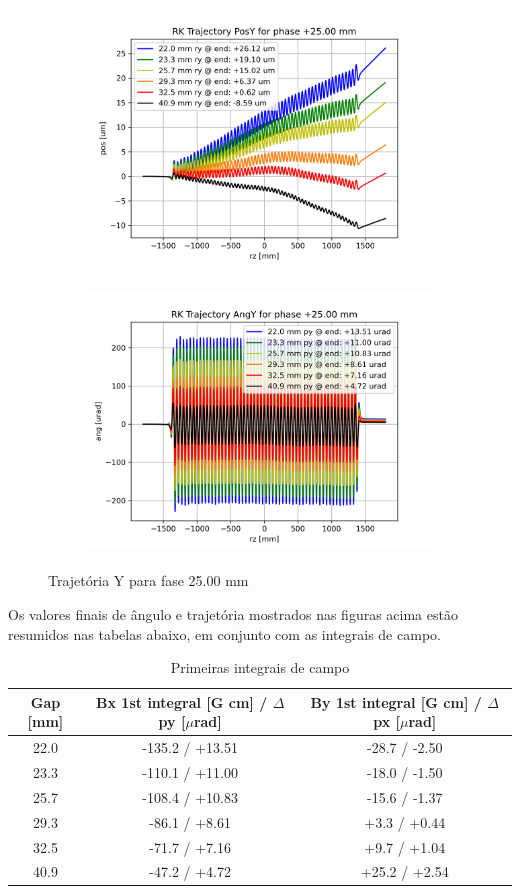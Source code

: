\documentclass[a4paper,12pt]{article}
\begin{document}
\begin{figure}[H]
\begin{subfigure}{0.5\textwidth}
\includegraphics[width=0.9\linewidth, height=7cm]{figs/phase25 RK Posy.png} 
\label{fig:subim125ty}
\end{subfigure}
\begin{subfigure}{0.5\textwidth}
\includegraphics[width=0.9\linewidth, height=7cm]{figs/phase25 RK Angy.png}
\label{fig:subim225ty}
\end{subfigure}
\caption{Trajetória Y para fase 25.00 mm}
\label{fig:trajy_25}
\end{figure}

Os valores finais de ângulo e trajetória mostrados nas figuras acima estão resumidos nas tabelas abaixo, em conjunto com as integrais de campo.


\begin{table}[H]
\centering
\caption{Primeiras integrais de campo}
\begin{tabular}{|c|c|c|}
\hline
   Gap [mm] & Bx 1st integral [G cm] / $\Delta$ py [$\mu$rad] & By 1st integral [G cm] / $\Delta$ px [$\mu$rad] \\
\hline
    22.0 & -135.2 / +13.51 & -28.7 / -2.50 \\
    23.3 & -110.1 / +11.00 & -18.0 / -1.50 \\
    25.7 & -108.4 / +10.83 & -15.6 / -1.37 \\
    29.3 & -86.1 / +8.61 &  +3.3 / +0.44 \\
    32.5 & -71.7 / +7.16 &  +9.7 / +1.04 \\
    40.9 & -47.2 / +4.72 & +25.2 / +2.54 \\
\hline
\end{tabular}
\end{table}
\end{document}

